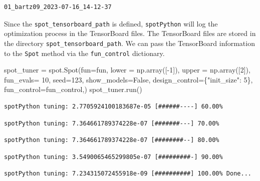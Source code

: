 \documentclass[
  letterpaper,
  DIV=11,
  numbers=noendperiod]{scrreprt}
\newenvironment{Shaded}{\begin{snugshade}}{\end{snugshade}}
\newcommand{\DecValTok}[1]{\textcolor[rgb]{0.68,0.00,0.00}{#1}}
\newcommand{\NormalTok}[1]{\textcolor[rgb]{0.00,0.23,0.31}{#1}}
\newcommand{\OperatorTok}[1]{\textcolor[rgb]{0.37,0.37,0.37}{#1}}
\newcommand{\StringTok}[1]{\textcolor[rgb]{0.13,0.47,0.30}{#1}}
\newcommand{\VariableTok}[1]{\textcolor[rgb]{0.07,0.07,0.07}{#1}}
\begin{document}
\begin{verbatim}
01_bartz09_2023-07-16_14-12-37
\end{verbatim}

Since the \texttt{spot\_tensorboard\_path} is defined,
\texttt{spotPython} will log the optimization process in the TensorBoard
files. The TensorBoard files are stored in the directory
\texttt{spot\_tensorboard\_path}. We can pass the TensorBoard
information to the \texttt{Spot} method via the \texttt{fun\_control}
dictionary.

\begin{Shaded}
\begin{Highlighting}[]
\NormalTok{spot\_tuner }\OperatorTok{=}\NormalTok{ spot.Spot(fun}\OperatorTok{=}\NormalTok{fun,}
\NormalTok{                   lower }\OperatorTok{=}\NormalTok{ np.array([}\OperatorTok{{-}}\DecValTok{1}\NormalTok{]),}
\NormalTok{                   upper }\OperatorTok{=}\NormalTok{ np.array([}\DecValTok{2}\NormalTok{]),}
\NormalTok{                   fun\_evals}\OperatorTok{=} \DecValTok{10}\NormalTok{,}
\NormalTok{                   seed}\OperatorTok{=}\DecValTok{123}\NormalTok{,}
\NormalTok{                   show\_models}\OperatorTok{=}\VariableTok{False}\NormalTok{,}
\NormalTok{                   design\_control}\OperatorTok{=}\NormalTok{\{}\StringTok{"init\_size"}\NormalTok{: }\DecValTok{5}\NormalTok{\},}
\NormalTok{                   fun\_control}\OperatorTok{=}\NormalTok{fun\_control,)}
\NormalTok{spot\_tuner.run()}
\end{Highlighting}
\end{Shaded}

\begin{verbatim}
spotPython tuning: 2.7705924100183687e-05 [######----] 60.00% 
\end{verbatim}

\begin{verbatim}
spotPython tuning: 7.364661789374228e-07 [#######---] 70.00% 
\end{verbatim}

\begin{verbatim}
spotPython tuning: 7.364661789374228e-07 [########--] 80.00% 
\end{verbatim}

\begin{verbatim}
spotPython tuning: 3.5490065465299805e-07 [#########-] 90.00% 
\end{verbatim}

\begin{verbatim}
spotPython tuning: 7.234315072455918e-09 [##########] 100.00% Done...
\end{verbatim}
\end{document}
